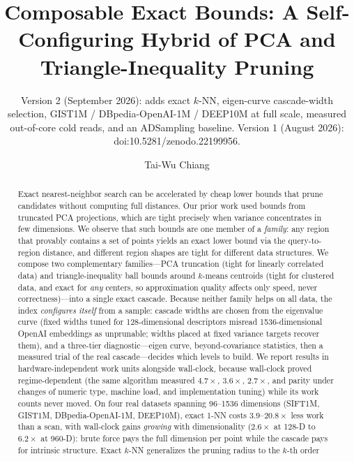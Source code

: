 \documentclass[sigconf,nonacm]{acmart}
\begin{document}
\title{Composable Exact Bounds: A Self-Configuring Hybrid of PCA and
Triangle-Inequality Pruning}
\subtitle{Version 2 (September 2026): adds exact $k$-NN, eigen-curve
cascade-width selection, GIST1M / DBpedia-OpenAI-1M / DEEP10M at full
scale, measured out-of-core cold reads, and an ADSampling baseline.
Version 1 (August 2026): doi:10.5281/zenodo.22199956.}

\author{Tai-Wu Chiang}

\begin{abstract}
Exact nearest-neighbor search can be accelerated by cheap lower bounds that
prune candidates without computing full distances. Our prior work used bounds
from truncated PCA projections, which are tight precisely when variance
concentrates in few dimensions. We observe that such bounds are one member of
a \emph{family}: any region that provably contains a set of points yields an
exact lower bound via the query-to-region distance, and different region
shapes are tight for different data structures. We compose two complementary
families---PCA truncation (tight for linearly correlated data) and
triangle-inequality ball bounds around $k$-means centroids (tight for
clustered data, and exact for \emph{any} centers, so approximation quality
affects only speed, never correctness)---into a single exact cascade. Because
neither family helps on all data, the index \emph{configures itself} from a
sample: cascade widths are chosen from the eigenvalue curve (fixed widths
tuned for 128-dimensional descriptors misread 1536-dimensional OpenAI
embeddings as unprunable; widths placed at fixed variance targets recover
them), and a three-tier diagnostic---eigen curve, beyond-covariance
statistics, then a measured trial of the real cascade---decides which levels
to build. We report results in hardware-independent work units alongside
wall-clock, because wall-clock proved regime-dependent (the same algorithm
measured $4.7\times$, $3.6\times$, $2.7\times$, and parity under changes of
numeric type, machine load, and implementation tuning) while its work counts
never moved. On four real datasets spanning 96--1536 dimensions (SIFT1M,
GIST1M, DBpedia-OpenAI-1M, DEEP10M), exact 1-NN costs $3.9$--$20.8\times$
less work than a scan, with wall-clock gains \emph{growing} with
dimensionality ($2.6\times$ at 128-D to $6.2\times$ at 960-D): brute force
pays the full dimension per point while the cascade pays for intrinsic
structure. Exact $k$-NN generalizes the pruning radius to the $k$-th order

\end{abstract}
\end{document}

